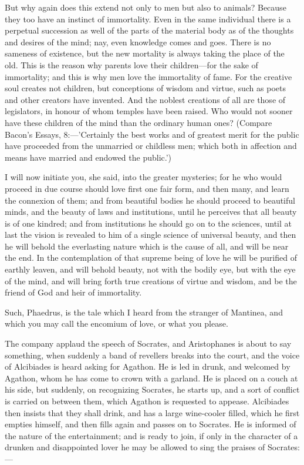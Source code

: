 \documentclass[11pt,letter]{article}
\begin{document}
\par  But why again does this extend not only to men but also to animals? Because they too have an instinct of immortality. Even in the same individual there is a perpetual succession as well of the parts of the material body as of the thoughts and desires of the mind; nay, even knowledge comes and goes. There is no sameness of existence, but the new mortality is always taking the place of the old. This is the reason why parents love their children—for the sake of immortality; and this is why men love the immortality of fame. For the creative soul creates not children, but conceptions of wisdom and virtue, such as poets and other creators have invented. And the noblest creations of all are those of legislators, in honour of whom temples have been raised. Who would not sooner have these children of the mind than the ordinary human ones? (Compare Bacon's Essays, 8:—'Certainly the best works and of greatest merit for the public have proceeded from the unmarried or childless men; which both in affection and means have married and endowed the public.')

\par  I will now initiate you, she said, into the greater mysteries; for he who would proceed in due course should love first one fair form, and then many, and learn the connexion of them; and from beautiful bodies he should proceed to beautiful minds, and the beauty of laws and institutions, until he perceives that all beauty is of one kindred; and from institutions he should go on to the sciences, until at last the vision is revealed to him of a single science of universal beauty, and then he will behold the everlasting nature which is the cause of all, and will be near the end. In the contemplation of that supreme being of love he will be purified of earthly leaven, and will behold beauty, not with the bodily eye, but with the eye of the mind, and will bring forth true creations of virtue and wisdom, and be the friend of God and heir of immortality.

\par  Such, Phaedrus, is the tale which I heard from the stranger of Mantinea, and which you may call the encomium of love, or what you please.

\par  The company applaud the speech of Socrates, and Aristophanes is about to say something, when suddenly a band of revellers breaks into the court, and the voice of Alcibiades is heard asking for Agathon. He is led in drunk, and welcomed by Agathon, whom he has come to crown with a garland. He is placed on a couch at his side, but suddenly, on recognizing Socrates, he starts up, and a sort of conflict is carried on between them, which Agathon is requested to appease. Alcibiades then insists that they shall drink, and has a large wine-cooler filled, which he first empties himself, and then fills again and passes on to Socrates. He is informed of the nature of the entertainment; and is ready to join, if only in the character of a drunken and disappointed lover he may be allowed to sing the praises of Socrates:—
\end{document}
